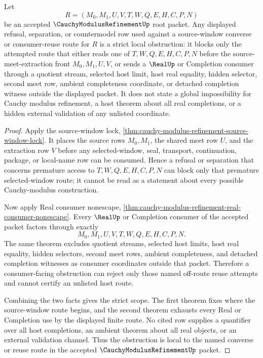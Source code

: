 \begin{corollary}
\label{cor:cauchy-modulus-refinement-source-window-strict-obstruction}
Let
$$
R=(M_0,M_1,U,V,T,W,Q,E,H,C,P,N)
$$
be an accepted $\CauchyModulusRefinementUp$ root packet. Any displayed refusal, separation, or countermodel row used against a source-window converse or consumer-reuse route for $R$ is a strict local obstruction: it blocks only the attempted route that either reads one of $T,W,Q,E,H,C,P,N$ before the source-meet-extraction front $M_0,M_1,U,V$, or sends a $\RealUp$ or Completion consumer through a quotient stream, selected host limit, host real equality, hidden selector, second meet row, ambient completeness coordinate, or detached completion witness outside the displayed packet. It does not state a global impossibility for Cauchy modulus refinement, a host theorem about all real completions, or a hidden external validation of any unlisted coordinate.
\end{corollary}
\begin{proof}
Apply the source-window lock, \autoref{thm:cauchy-modulus-refinement-source-window-lock}. It places the source rows $M_0,M_1$, the shared meet row $U$, and the extraction row $V$ before any selected-window, seal, transport, continuation, package, or local-name row can be consumed. Hence a refusal or separation that concerns premature access to $T,W,Q,E,H,C,P,N$ can block only that premature selected-window route; it cannot be read as a statement about every possible Cauchy-modulus construction.

Now apply Real consumer nonescape, \autoref{thm:cauchy-modulus-refinement-real-consumer-nonescape}. Every $\RealUp$ or Completion consumer of the accepted packet factors through exactly
$$
M_0,M_1,U,V,T,W,Q,E,H,C,P,N.
$$
The same theorem excludes quotient streams, selected host limits, host real equality, hidden selectors, second meet rows, ambient completeness, and detached completion witnesses as consumer coordinates outside that packet. Therefore a consumer-facing obstruction can reject only those named off-route reuse attempts and cannot certify an unlisted host route.

Combining the two facts gives the strict scope. The first theorem fixes where the source-window route begins, and the second theorem exhausts every Real or Completion use by the displayed finite route. No cited row supplies a quantifier over all host completions, an ambient theorem about all real objects, or an external validation channel. Thus the obstruction is local to the named converse or reuse route in the accepted $\CauchyModulusRefinementUp$ packet.
\end{proof}
